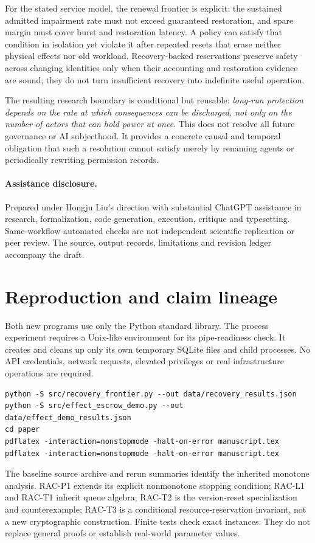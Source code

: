 For the stated service model, the renewal frontier is explicit: the sustained admitted impairment rate must not exceed guaranteed restoration, and spare margin must cover burst and restoration latency. A policy can satisfy that condition in isolation yet violate it after repeated resets that erase neither physical effects nor old workload. Recovery-backed reservations preserve safety across changing identities only when their accounting and restoration evidence are sound; they do not turn insufficient recovery into indefinite useful operation.

The resulting research boundary is conditional but reusable: \emph{long-run protection depends on the rate at which consequences can be discharged, not only on the number of actors that can hold power at once}. This does not resolve all future governance or AI subjecthood. It provides a concrete causal and temporal obligation that such a resolution cannot satisfy merely by renaming agents or periodically rewriting permission records.

\paragraph{Assistance disclosure.}
Prepared under Hongju Liu's direction with substantial ChatGPT assistance in research, formalization, code generation, execution, critique and typesetting. Same-workflow automated checks are not independent scientific replication or peer review. The source, output records, limitations and revision ledger accompany the draft.

\appendix
\section{Reproduction and claim lineage}
Both new programs use only the Python standard library. The process experiment requires a Unix-like environment for its pipe-readiness check. It creates and cleans up only its own temporary SQLite files and child processes. No API credentials, network requests, elevated privileges or real infrastructure operations are required.
\begin{lstlisting}
python -S src/recovery_frontier.py --out data/recovery_results.json
python -S src/effect_escrow_demo.py --out data/effect_demo_results.json
cd paper
pdflatex -interaction=nonstopmode -halt-on-error manuscript.tex
pdflatex -interaction=nonstopmode -halt-on-error manuscript.tex
\end{lstlisting}
The baseline source archive and rerun summaries identify the inherited monotone analysis. RAC-P1 extends its explicit nonmonotone stopping condition; RAC-L1 and RAC-T1 inherit queue algebra; RAC-T2 is the version-reset specialization and counterexample; RAC-T3 is a conditional resource-reservation invariant, not a new cryptographic construction. Finite tests check exact instances. They do not replace general proofs or establish real-world parameter values.

